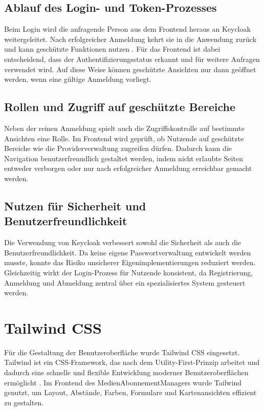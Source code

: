 \subsection{Ablauf des Login- und Token-Prozesses}
Beim Login wird die anfragende Person aus dem Frontend heraus an Keycloak weitergeleitet. Nach erfolgreicher Anmeldung kehrt sie in die Anwendung zur\"uck und kann gesch\"utzte Funktionen nutzen \cite{keycloak_docs}. F\"ur das Frontend ist dabei entscheidend, dass der Authentifizierungsstatus erkannt und f\"ur weitere Anfragen verwendet wird. Auf diese Weise k\"onnen gesch\"utzte Ansichten nur dann ge\"offnet werden, wenn eine g\"ultige Anmeldung vorliegt.

\subsection{Rollen und Zugriff auf gesch\"utzte Bereiche}
Neben der reinen Anmeldung spielt auch die Zugriffskontrolle auf bestimmte Ansichten eine Rolle. Im Frontend wird gepr\"uft, ob Nutzende auf gesch\"utzte Bereiche wie die Providerverwaltung zugreifen d\"urfen. Dadurch kann die Navigation benutzerfreundlich gestaltet werden, indem nicht erlaubte Seiten entweder verborgen oder nur nach erfolgreicher Anmeldung erreichbar gemacht werden.

\subsection{Nutzen f\"ur Sicherheit und Benutzerfreundlichkeit}
Die Verwendung von Keycloak verbessert sowohl die Sicherheit als auch die Benutzerfreundlichkeit. Da keine eigene Passwortverwaltung entwickelt werden musste, konnte das Risiko unsicherer Eigenimplementierungen reduziert werden. Gleichzeitig wirkt der Login-Prozess f\"ur Nutzende konsistent, da Registrierung, Anmeldung und Abmeldung zentral \"uber ein spezialisiertes System gesteuert werden.

\section{Tailwind CSS}
F\"ur die Gestaltung der Benutzeroberfl\"ache wurde Tailwind CSS eingesetzt. Tailwind ist ein CSS-Framework, das nach dem Utility-First-Prinzip arbeitet und dadurch eine schnelle und flexible Entwicklung moderner Benutzeroberfl\"achen erm\"oglicht \cite{tailwind_docs,tailwind_home}. Im Frontend des MedienAbonnementManagers wurde Tailwind genutzt, um Layout, Abst\"ande, Farben, Formulare und Kartenansichten effizient zu gestalten.

